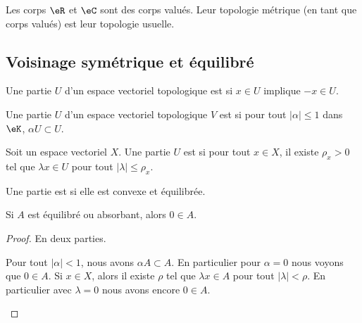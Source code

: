 \begin{lemma}       \label{LEMooCHDTooZsgXEK}
	Les corps \( \eR\) et \( \eC\) sont des corps valués. Leur topologie métrique (en tant que corps valués) est leur topologie usuelle.
\end{lemma}


\subsection{Voisinage symétrique et équilibré}

\begin{definition}		\label{DEFooKBMAooAhYQAm}
	Une partie \( U\) d'un espace vectoriel topologique est  si \( x\in U\) implique \( -x\in U\).
\end{definition}

\begin{definition}		\label{DEFooPNRIooEFAlii}
	Une partie \( U\) d'un espace vectoriel topologique \( V\) est  si pour tout \( | \alpha |\leq 1\) dans \( \eK\), \( \alpha U\subset U\).
\end{definition}

\begin{definition}		\label{DEFooMNZJooSIAVGZ}
	Soit un espace vectoriel \( X\). Une partie \( U\) est  si pour tout \( x\in X\), il existe \( \rho_x>0\) tel que \( \lambda x\in U\) pour tout \( | \lambda |\leq \rho_x\).
\end{definition}

\begin{definition} \label{DEFooYSWJooPkcrJe}
	Une partie est  si elle est convexe et équilibrée.
\end{definition}

\begin{lemma}		\label{LEMooXKOTooLWDXhp}
	Si \( A\) est équilibré ou absorbant, alors \( 0\in A\).
\end{lemma}

\begin{proof}
	En deux parties.
	\begin{subproof}
		Pour tout \( | \alpha |<1\), nous avons \( \alpha A\subset A\). En particulier pour \( \alpha=0\) nous voyons que \( 0\in A\).
		Si \( x\in X\), alors il existe \( \rho\) tel que \( \lambda x\in A\) pour tout \( | \lambda |<\rho\). En particulier avec \( \lambda=0\) nous avons encore \( 0\in A\).
	\end{subproof}
\end{proof}



